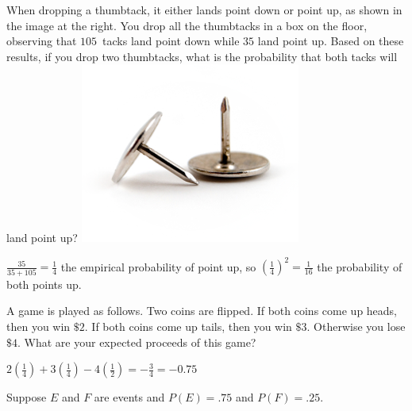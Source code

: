 \documentclass[answers,addpoints,12pt]{exam}
\begin{document}
\begin{questions}
\question[10]
\begin{multicols}{2}
When dropping a thumbtack, it either lands point down
or point up, as shown in the image at the right.
You drop all the thumbtacks in a box on the floor, observing that
$105$~tacks land point down while $35$ land point up.
Based on these results, if you drop two thumbtacks, what
is the probability that both tacks will land point up?
\includegraphics[scale=.5]{Thumbtacks}
\end{multicols}
\begin{solution}
$\frac{35}{35+105}=\frac{1}{4}$ the empirical probability
of point up, so $\left(\frac{1}{4}\right)^2=\frac{1}{16}$
the probability of both points up.
\end{solution}

\question[10] A game is played as follows.
Two coins are flipped. If both coins come up
heads, then you win $\$2$. If both coins come
up tails, then you win $\$3$. 
Otherwise you lose $\$4$. What are your expected proceeds
of this game?
\begin{solution}
$2\left(\frac{1}{4}\right)+3\left(\frac{1}{4}\right)
-4\left(\frac{1}{2}\right)=-\frac{3}{4}=-0.75$
\end{solution}

\question[10] Suppose $E$ and $F$ are events
and $P\left(E\right)=.75$ and $P\left(F\right)=.25$.


\end{questions}
\end{document}
